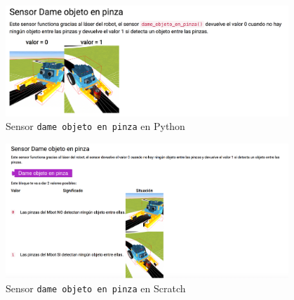 \begin{figure}[H]
    \centering
    \includegraphics[width=0.95\textwidth, height=0.45\textwidth]{chapters/images/teoriag5python.png}
    \caption{Sensor \texttt{dame objeto en pinza} en Python}
    \label{fig:my_label}
\end{figure}
\begin{figure}[H]
    \centering
    \includegraphics[width=0.95\textwidth, height=0.45\textwidth]{chapters/images/teoriag5scratch.png}
    \caption{Sensor \texttt{dame objeto en pinza} en Scratch}
    \label{fig:my_label}
\end{figure}

